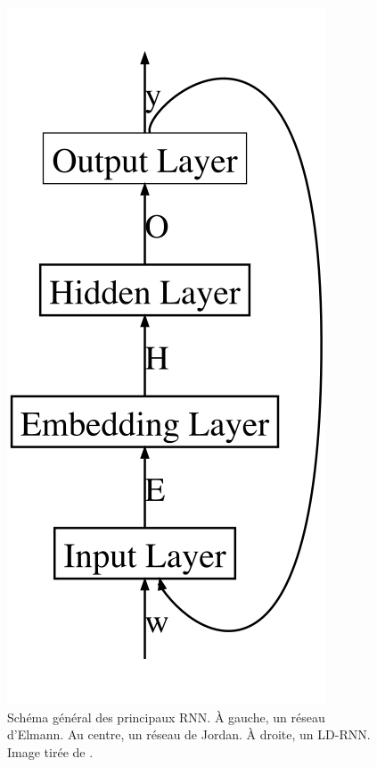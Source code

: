 \documentclass[citation\_needed]{subfiles}
\begin{document}
\begin{figure}[ht!]
\begin{minipage}{0.325\linewidth}
    \includegraphics[scale=0.4]{images/NN/LD-RNN/OcramRNN_inkscape}
    \end{minipage}
    \caption{Schéma général des principaux RNN. À gauche, un réseau d'Elmann. Au centre, un réseau de Jordan. À droite, un LD-RNN. Image tirée de \citet{dupont2017a}.}
    \label{fig:3architecgtures}
\end{figure}
\end{document}
